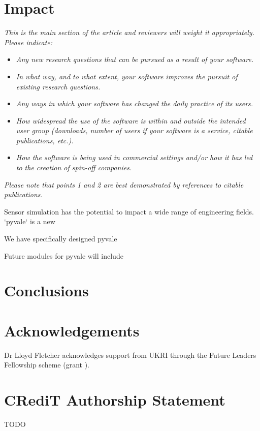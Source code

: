 \documentclass[11pt, a4paper, oneside, onecolumn]{article}
\begin{document}
\section{Impact}
\textit{This is the main section of the article and reviewers will weight it appropriately.
Please indicate:}
\begin{itemize}
    \item \textit{Any new research questions that can be pursued as a result of your software.}
    \item \textit{In what way, and to what extent, your software improves the pursuit of existing research questions.}
    \item \textit{Any ways in which your software has changed the daily practice of its users.}
    \item \textit{How widespread the use of the software is within and outside the intended user group (downloads, number of users if your software is a service, citable publications, etc.).}
    \item \textit{How the software is being used in commercial settings and/or how it has led to the creation of spin-off companies.}
    \end{itemize}
\textit{Please note that points 1 and 2 are best demonstrated by
  references to citable publications.}
  
Sensor simulation has the potential to impact a wide range of engineering fields. `pyvale` is a new 

We have specifically designed pyvale 

Future modules for pyvale will include 

\section{Conclusions}


\section*{Acknowledgements} \label{sec:acknowledgements}
Dr Lloyd Fletcher acknowledges support from UKRI through the Future Leaders Fellowship scheme (grant ).

\section*{CRediT Authorship Statement}
TODO


 
\end{document}
